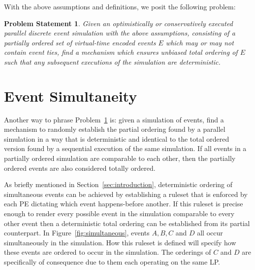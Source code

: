 \documentclass[nonacm,sigconf]{acmart}
\newtheorem{problem}{Problem Statement}
\begin{document}
With the above assumptions and definitions, we posit the following problem:

\begin{problem}\label{prob:deterministic-ties}
  Given an optimistically or conservatively executed parallel discrete event simulation with the above assumptions, consisting of a partially ordered set of virtual-time encoded events $E$ which may or may not contain event ties, find a mechanism which ensures unbiased total ordering of $E$ such that any subsequent executions of the simulation are deterministic.
\end{problem}


\section{Event Simultaneity}\label{sec:simultaneity}
Another way to phrase Problem~\ref{prob:deterministic-ties} is: given a simulation of events, find a mechanism to randomly establish the partial ordering found by a parallel simulation in a way that is deterministic and identical to the total ordered version found by a sequential execution of the same simulation. If all events in a partially ordered simulation are comparable to each other, then the partially ordered events are also considered totally ordered.



As briefly mentioned in Section~\ref{sec:introduction}, deterministic ordering of simultaneous events can be achieved by establishing a ruleset that is enforced by each PE dictating which event happens-before another. If this ruleset is precise enough to render every possible event in the simulation comparable to every other event then a deterministic total ordering can be established from its partial counterpart. In Figure~\ref{fig:simultaneous}, events $A,B,C$ and $D$ all occur simultaneously in the simulation. How this ruleset is defined will specify how these events are ordered to occur in the simulation. The orderings of $C$ and $D$ are specifically of consequence due to them each operating on the same LP.
\end{document}
